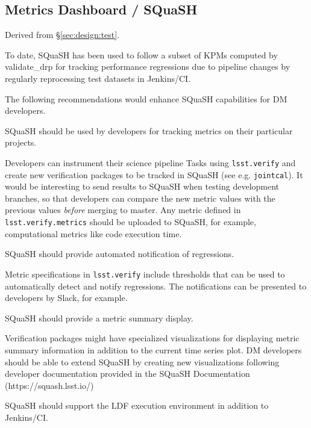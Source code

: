 \subsection{Metrics Dashboard / SQuaSH}

Derived from \S\ref{sec:design:test}.


To date, SQuaSH has been used to follow a subset of KPMs computed by validate\_drp for tracking performance regressions due to pipeline changes by regularly reprocessing test datasets in Jenkins/CI.

The following recommendations would enhance SQuaSH capabilities for DM developers.

\begin{recommendation}
SQuaSH should be used by developers for tracking metrics on their particular projects.
\end{recommendation}

Developers can instrument their science pipeline Tasks using \texttt{lsst.verify} and create new verification packages to be tracked in SQuaSH (see e.g. \texttt{jointcal}). It would be interesting to send results to SQuaSH when testing development branches, so that developers can compare the new metric values with the previous values \textit{before} merging to master. Any metric defined in \texttt{lsst.verify.metrics} should be uploaded to SQuaSH, for example, computational metrics like code execution time.

\begin{recommendation}
SQuaSH should provide automated notification of regressions.
\end{recommendation}

Metric specifications in \texttt{lsst.verify} include thresholds that can be used to automatically detect and notify regressions. The notifications can be presented to developers by Slack, for example.

\begin{recommendation}
SQuaSH should provide a metric summary display.
\end{recommendation}

Verification packages might have specialized visualizations for displaying metric summary information in addition to the current time series plot. DM developers should be able to extend SQuaSH by creating new visualizations following developer documentation provided in the SQuaSH Documentation (https://squash.lsst.io/)

\begin{recommendation}
SQuaSH should support the LDF execution environment in addition to Jenkins/CI.
\end{recommendation}

